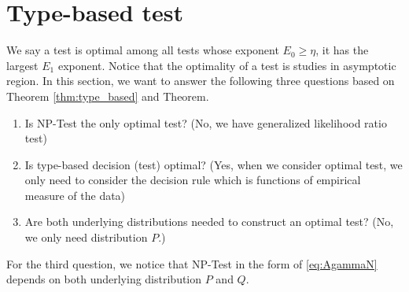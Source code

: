 \documentclass{article}
\begin{document}
\section{Type-based test}
 We say a test
 is optimal among all tests whose exponent $E_0 \geq \eta$, it has the largest $E_1$ exponent.
 Notice that the optimality of a test is studies
 in asymptotic region.
 In this section, we want to answer the following
 three questions based on Theorem
 \ref{thm:type_based} and Theorem.
 \begin{enumerate}
     \item Is NP-Test the only optimal test? (No, we have generalized likelihood ratio test)
     \item Is type-based decision (test) optimal?
     (Yes, when we consider optimal test, we only need to consider the decision rule which is
     functions of empirical measure of the data)
     \item Are both underlying distributions needed to construct an optimal test? (No, we only need
     distribution $P$.)
 \end{enumerate}
 For the third question, we notice that NP-Test
 in the form of \eqref{eq:AgammaN}
 depends on both underlying distribution $P$
 and $Q$.
 
\end{document}
